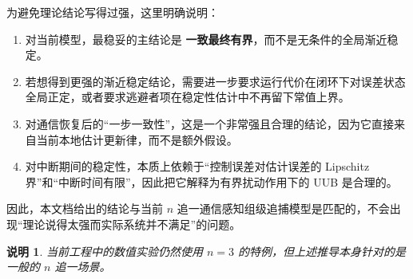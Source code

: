 \documentclass[12pt,a4paper]{ctexart}
\newtheorem{remark}{说明}
\begin{document}
为避免理论结论写得过强，这里明确说明：

\begin{enumerate}[label=\arabic*)]
    \item 对当前模型，最稳妥的主结论是 \textbf{一致最终有界}，而不是无条件的全局渐近稳定。
    \item 若想得到更强的渐近稳定结论，需要进一步要求运行代价在闭环下对误差状态全局正定，或者要求逃避者项在稳定性估计中不再留下常值上界。
    \item 对通信恢复后的“一步一致性”，这是一个非常强且合理的结论，因为它直接来自当前本地估计更新律，而不是额外假设。
    \item 对中断期间的稳定性，本质上依赖于“控制误差对估计误差的 Lipschitz 界”和“中断时间有限”，因此把它解释为有界扰动作用下的 UUB 是合理的。
\end{enumerate}

因此，本文档给出的结论与当前 $n$ 追一通信感知组级追捕模型是匹配的，不会出现“理论说得太强而实际系统并不满足”的问题。

\begin{remark}
当前工程中的数值实验仍然使用 $n=3$ 的特例，但上述推导本身针对的是一般的 $n$ 追一场景。
\end{remark}
\end{document}
